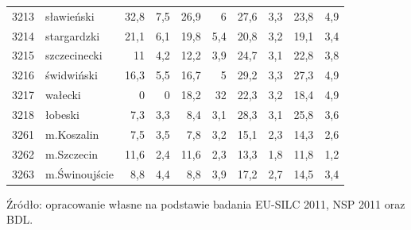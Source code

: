 \begin{center}
\begin{longtable}{lp{3cm}rrrrrrrr}
3213 & sławieński              & 32,8    & 7,5         & 26,9     & 6            & 27,6     & 3,3          & 23,8     & 4,9          \\
3214 & stargardzki             & 21,1    & 6,1         & 19,8     & 5,4          & 20,8     & 3,2          & 19,1     & 3,4          \\
3215 & szczecinecki            & 11      & 4,2         & 12,2     & 3,9          & 24,7     & 3,1          & 22,8     & 3,8          \\
3216 & świdwiński              & 16,3    & 5,5         & 16,7     & 5            & 29,2     & 3,3          & 27,3     & 4,9          \\
3217 & wałecki                 & 0       & 0           & 18,2     & 32           & 22,3     & 3,2          & 18,4     & 4,9          \\
3218 & łobeski                 & 7,3     & 3,3         & 8,4      & 3,1          & 28,3     & 3,1          & 25,8     & 3,6          \\
3261 & m.Koszalin              & 7,5     & 3,5         & 7,8      & 3,2          & 15,1     & 2,3          & 14,3     & 2,6          \\
3262 & m.Szczecin              & 11,6    & 2,4         & 11,6     & 2,3          & 13,3     & 1,8          & 11,8     & 1,2          \\
3263 & m.Świnoujście           & 8,8     & 4,4         & 8,8      & 3,9          & 17,2     & 2,7          & 14,5     & 3,4          \\
\hline
\end{longtable}
\small{Źródło: opracowanie własne na podstawie badania EU-SILC 2011, NSP 2011 oraz BDL.}
\end{center}


